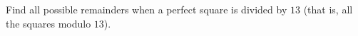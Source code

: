 Find all possible remainders when a perfect square is divided by $13$ (that is, all the squares modulo $13$).
